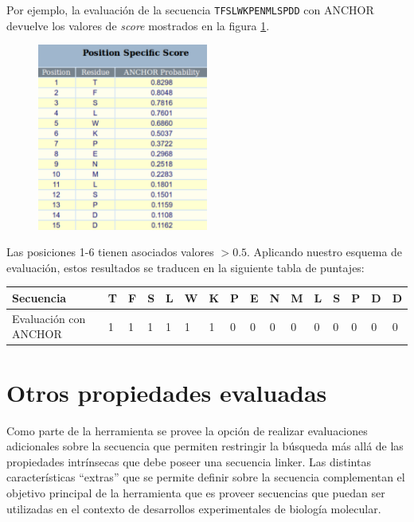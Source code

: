 Por ejemplo, la evaluación de la secuencia \texttt{TFSLWKPENMLSPDD} con ANCHOR devuelve los valores de \textit{score} mostrados en la figura \ref{anchorResults}. 

\begin{figure}[ht]
\centering
\includegraphics[width=0.5\textwidth]{img/anchorTabla.png} 
\caption{}
\label{anchorResults}
\end{figure}

Las posiciones 1-6 tienen asociados valores $>0.5$. Aplicando nuestro esquema de evaluación, estos resultados se traducen en la siguiente tabla de puntajes:

\vspace{0.5cm}
\noindent
\begin{tabular}{llllllllllllllll} 
\hline      
Secuencia & \textbf{T} & \textbf{F} & \textbf{S} & \textbf{L} & \textbf{W} & \textbf{K} & \textbf{P} & \textbf{E} & \textbf{N} & \textbf{M} & \textbf{L} & \textbf{S} & \textbf{P} & \textbf{D} & \textbf{D} \\ \hline
Evaluación con ANCHOR & 1 & 1 & 1 & 1 & 1 & 1 & 0 & 0 & 0 & 0 & 0 & 0 & 0 & 0 & 0\\ \hline
\end{tabular}


















\section{Otros propiedades evaluadas}

Como parte de la herramienta se provee la opción de realizar evaluaciones adicionales sobre la secuencia que permiten restringir la búsqueda más allá de las propiedades intrínsecas que debe poseer una secuencia linker.
Las distintas características ``extras'' que se permite definir sobre la secuencia complementan el objetivo principal de la herramienta que es proveer secuencias que puedan ser utilizadas 
en el contexto de desarrollos experimentales de biología molecular.

